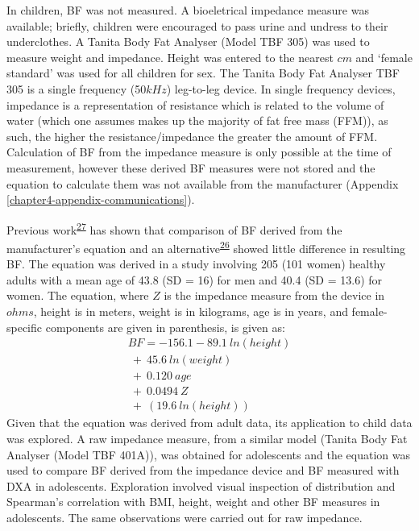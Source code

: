 \documentclass[11pt,twoside]{bristolthesis}
\begin{document}
In children, BF was not measured. A bioeletrical impedance measure was available; briefly, children were encouraged to pass urine and undress to their underclothes. A Tanita Body Fat Analyser (Model TBF 305) was used to measure weight and impedance. Height was entered to the nearest \(cm\) and `female standard' was used for all children for sex. The Tanita Body Fat Analyser TBF 305 is a single frequency (50\(kHz\)) leg-to-leg device. In single frequency devices, impedance is a representation of resistance which is related to the volume of water (which one assumes makes up the majority of fat free mass (FFM)), as such, the higher the resistance/impedance the greater the amount of FFM. Calculation of BF from the impedance measure is only possible at the time of measurement, however these derived BF measures were not stored and the equation to calculate them was not available from the manufacturer (Appendix \ref{chapter4-appendix-communications}).

Previous work\textsuperscript{\protect\hyperlink{ref-Chouinard2007}{27}} has shown that comparison of BF derived from the manufacturer's equation and an alternative\textsuperscript{\protect\hyperlink{ref-Jebb2000}{26}} showed little difference in resulting BF. The equation was derived in a study involving 205 (101 women) healthy adults with a mean age of 43.8 (SD = 16) for men and 40.4 (SD = 13.6) for women. The equation, where \(Z\) is the impedance measure from the device in \(ohms\), height is in meters, weight is in kilograms, age is in years, and female-specific components are given in parenthesis, is given as:
\begin{equation}
\begin{split}
  BF = -156.1 - 89.1\ ln(height) \\
  \ +\ 45.6\ ln(weight) \\
  \ +\ 0.120\ age\ \\
  \ +\ 0.0494\ Z \\
  \ +\ (19.6\ ln(height))
\end{split}
  \label{eq:BF}
\end{equation}
Given that the equation was derived from adult data, its application to child data was explored. A raw impedance measure, from a similar model (Tanita Body Fat Analyser (Model TBF 401A)), was obtained for adolescents and the equation was used to compare BF derived from the impedance device and BF measured with DXA in adolescents. Exploration involved visual inspection of distribution and Spearman's correlation with BMI, height, weight and other BF measures in adolescents. The same observations were carried out for raw impedance.
\end{document}
